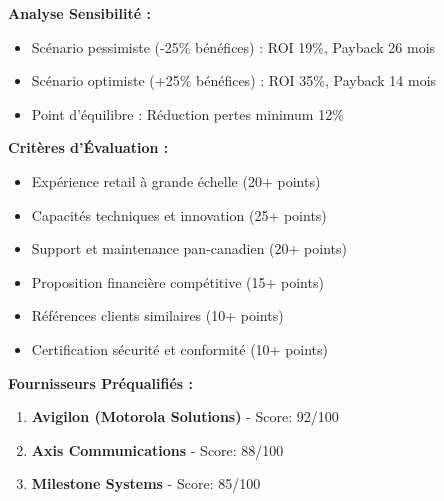 \documentclass{dollarama}
\begin{document}
\begin{dollaramaappendices}
\textbf{Analyse Sensibilité :}
\begin{itemize}
    \item Scénario pessimiste (-25\% bénéfices) : ROI 19\%, Payback 26 mois
    \item Scénario optimiste (+25\% bénéfices) : ROI 35\%, Payback 14 mois
    \item Point d'équilibre : Réduction pertes minimum 12\%
\end{itemize}

\textbf{Critères d'Évaluation :}
\begin{itemize}
    \item Expérience retail à grande échelle (20+ points)
    \item Capacités techniques et innovation (25+ points)
    \item Support et maintenance pan-canadien (20+ points)
    \item Proposition financière compétitive (15+ points)
    \item Références clients similaires (10+ points)
    \item Certification sécurité et conformité (10+ points)
\end{itemize}

\textbf{Fournisseurs Préqualifiés :}
\begin{enumerate}
    \item \textbf{Avigilon (Motorola Solutions)} - Score: 92/100
    \item \textbf{Axis Communications} - Score: 88/100
    \item \textbf{Milestone Systems} - Score: 85/100
\end{enumerate}

\end{dollaramaappendices}
\end{document}
